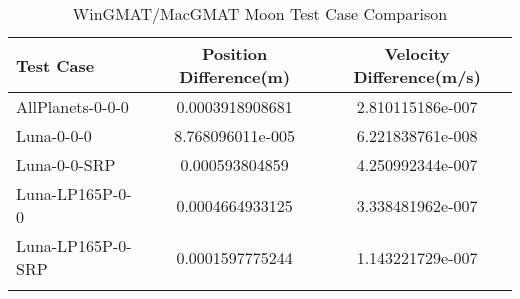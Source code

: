 \begin{table}[htbp!]
\centering
\caption{ WinGMAT/MacGMAT Moon Test Case Comparison}
      \begin{tabular}{lcc}
      \hline\hline
          Test Case & Position Difference(m) & Velocity Difference(m/s) \\
         \hline
         AllPlanets-0-0-0 & 0.0003918908681 & 2.810115186e-007 \\
         Luna-0-0-0 & 8.768096011e-005 & 6.221838761e-008 \\
         Luna-0-0-SRP & 0.000593804859 & 4.250992344e-007 \\
         Luna-LP165P-0-0 & 0.0004664933125 & 3.338481962e-007 \\
         Luna-LP165P-0-SRP & 0.0001597775244 & 1.143221729e-007 \\
      \hline\hline
      \label{Table: Moon WinGMAT-MacGMAT Table} 
\end{tabular}
\end{table}
